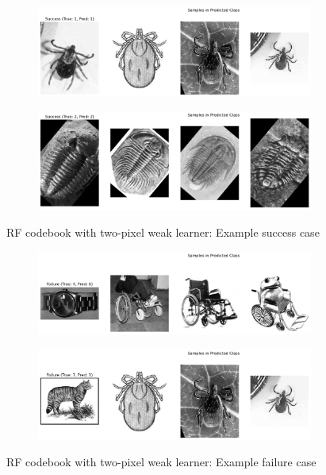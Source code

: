 \begin{figure}[htbp]
	\centering
	\begin{subfigure}{0.45\linewidth}
		\centering
		\includegraphics[width=\linewidth]{image/conf-appendix/rf_two_succ1.png}
	\end{subfigure}%
	\quad
	\begin{subfigure}{0.45\linewidth}
		\centering
		\includegraphics[width=\linewidth]{image/conf-appendix/rf_two_succ2.png}
	\end{subfigure}
	\caption{RF codebook with two-pixel weak learner: Example success case}
	\label{fig:APP-q3-case3}
\end{figure}
\begin{figure}[htbp]
	\centering
	\begin{subfigure}[t]{0.45\linewidth}
		\centering
		\includegraphics[width=\linewidth]{image/conf-appendix/rf_two_fail1.png}
	\end{subfigure}%
	\quad
	\begin{subfigure}[t]{0.45\linewidth}
		\centering
		\includegraphics[width=\linewidth]{image/conf-appendix/rf_two_fail2.png}
	\end{subfigure}
	\caption{RF codebook with two-pixel weak learner: Example failure case}
	\label{fig:APP-q3-case4}
\end{figure}